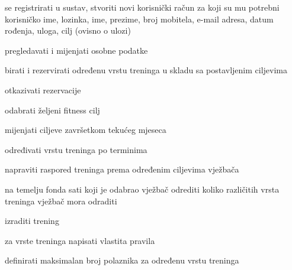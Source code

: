 			
			\begin{packed_enum}
				\item  {}
				
				\begin{packed_enum}
					
					\item se registrirati u sustav, stvoriti novi korisnički račun za koji su mu potrebni korisničko ime, lozinka, ime, prezime, broj mobitela, e-mail adresa, datum rođenja, uloga, cilj (ovisno o ulozi)
				
					
				\end{packed_enum}
			
				\item  {}
				
				\begin{packed_enum}
					
					\item pregledavati i mijenjati osobne podatke
					\item birati i rezervirati određenu vrstu treninga u skladu sa postavljenim ciljevima
     				\item otkazivati rezervacije
					\item odabrati željeni fitness cilj
					\item mijenjati ciljeve završetkom tekućeg mjeseca
					
				\end{packed_enum}
				
				\item  {}
				
				\begin{packed_enum}
					
					\item određivati vrstu treninga po terminima
					\item napraviti raspored treninga prema određenim ciljevima vježbača
					\item na temelju fonda sati koji je odabrao vježbač odrediti koliko različitih vrsta treninga vježbač mora odraditi
					\item izraditi trening
					\item za vrste treninga napisati vlastita pravila
					\item definirati maksimalan broj polaznika za određenu vrstu treninga
					
				\end{packed_enum}
				

\end{packed_enum}
